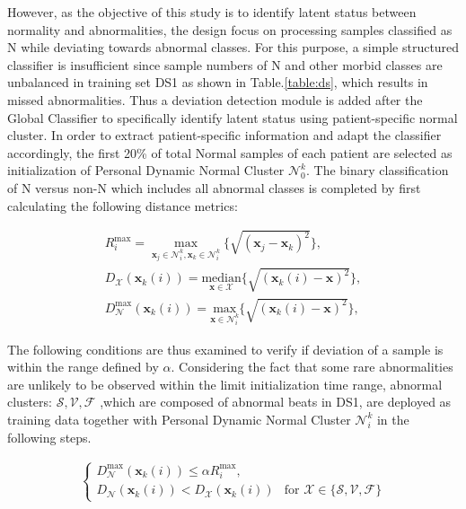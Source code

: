 However, as the objective of this study is to identify latent status between normality and abnormalities, the design focus on processing samples classified as N while deviating towards abnormal classes. For this purpose, a simple structured classifier is insufficient since sample numbers of N and other morbid classes are unbalanced in training set DS1 as shown in Table.\ref{table:ds}, which results in missed abnormalities. Thus a deviation detection module is added after the Global Classifier to specifically identify latent status using patient-specific normal cluster. In order to extract patient-specific information and adapt the classifier accordingly, the first 20\% of total Normal samples of each patient are selected as initialization of Personal Dynamic Normal Cluster $\mathcal{N}_0^k$. The binary classification of N versus non-N which includes all abnormal classes is completed by first calculating the following distance metrics:

\begin{align}
\label{eq:matrices}
R_i^{\max}=\underset{\mathbf{x}_j\in\mathcal{N}_i^k,\mathbf{x}_k\in\mathcal{N}_i^k}{\max}\{\sqrt{(\mathbf{x}_j-\mathbf{x}_k)^2}\},
\\
D_\mathcal{X}(\mathbf{x}_k(i))=\underset{\mathbf{x} \in\mathcal{X}}{\text{median}}\{\sqrt{(\mathbf{x}_k(i)-\mathbf{x})^2}\},
\\
D_\mathcal{N}^{\max}(\mathbf{x}_k(i))=\underset{\mathbf{x} \in\mathcal{N}_i^k}{\text{max}}\{\sqrt{(\mathbf{x}_k(i)-\mathbf{x})^2}\},
\end{align}

The following conditions are thus examined to verify if deviation of a sample is within the range defined by $\alpha$. Considering the fact that some rare abnormalities are unlikely to be observed within the limit initialization time range, abnormal clusters: ${\mathcal{S},\mathcal{V},\mathcal{F}}$ ,which are composed of abnormal beats in DS1, are deployed as training data together with Personal Dynamic Normal Cluster $\mathcal{N}_i^k$ in the following steps.

\begin{align}\label{eq:condition1}
\begin{cases}
D_\mathcal{N}^{\max}(\mathbf{x}_k(i))  \leq\alpha R_i^{\max},\\
D_\mathcal{N}(\mathbf{x}_k(i)) < D_\mathcal{X}(\mathbf{x}_k(i)) &\text{for~} \mathcal{X}\in\{\mathcal{S},\mathcal{V},\mathcal{F}\}   %
\end{cases}
\end{align}

